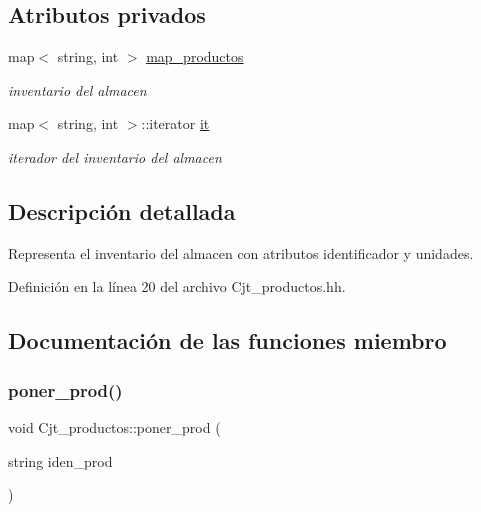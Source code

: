 \subsection*{Atributos privados}
\begin{DoxyCompactItemize}
\item 
map$<$ string, int $>$ \hyperlink{class_cjt__productos_a44e63c644fdec6cff81dcdb3cf79860c}{map\+\_\+productos}
\begin{DoxyCompactList}\small\item\em inventario del almacen \end{DoxyCompactList}\item 
map$<$ string, int $>$\+::iterator \hyperlink{class_cjt__productos_adedbe2194ed053eb446ec367e6d5e60e}{it}
\begin{DoxyCompactList}\small\item\em iterador del inventario del almacen \end{DoxyCompactList}\end{DoxyCompactItemize}


\subsection{Descripción detallada}
Representa el inventario del almacen con atributos identificador y unidades. 

Definición en la línea 20 del archivo Cjt\+\_\+productos.\+hh.



\subsection{Documentación de las funciones miembro}
\mbox{\label{class_cjt__productos_a501153e137c6437ff84faac121a88bc8}} 
\subsubsection{\texorpdfstring{poner\+\_\+prod()}{poner\_prod()}}
{\footnotesize\ttfamily void Cjt\+\_\+productos\+::poner\+\_\+prod (\begin{DoxyParamCaption}\item[{string}]{iden\+\_\+prod }\end{DoxyParamCaption})}



